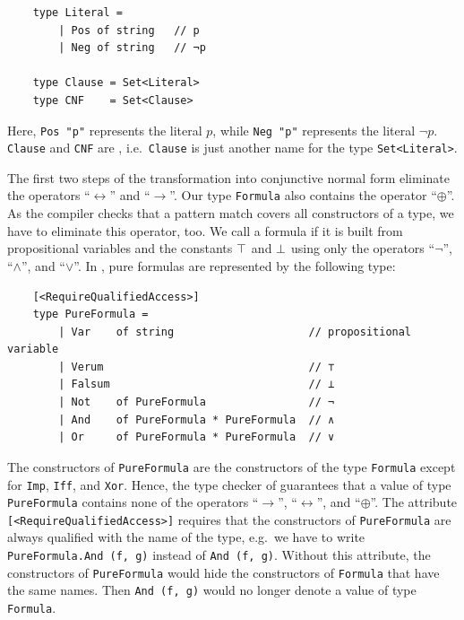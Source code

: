 \begin{verbatim}
    type Literal =
        | Pos of string   // p
        | Neg of string   // ¬p

    type Clause = Set<Literal>
    type CNF    = Set<Clause>
\end{verbatim}

\noindent
Here, \texttt{Pos "p"} represents the literal $p$, while \texttt{Neg "p"} represents the literal $\neg p$.
\texttt{Clause} and \texttt{CNF} are , i.e.~\texttt{Clause} is just another name for the
type \texttt{Set<Literal>}.

The first two steps of the transformation into conjunctive normal form eliminate the operators
``$\leftrightarrow$'' and ``$\rightarrow$''.  Our type \texttt{Formula} also contains the operator
``$\oplus$''.  As the \Fsharp{} compiler checks that a pattern match covers all constructors of a type, we
have to eliminate this operator, too.  We call a formula  if it is
built from propositional variables and the constants $\top$ and $\bot$ using only the operators
``$\neg$'', ``$\wedge$'', and ``$\vee$''.  In \Fsharp, pure formulas are represented by the following type:

\begin{verbatim}
    [<RequireQualifiedAccess>]
    type PureFormula =
        | Var    of string                     // propositional variable
        | Verum                                // ⊤
        | Falsum                               // ⊥
        | Not    of PureFormula                // ¬
        | And    of PureFormula * PureFormula  // ∧
        | Or     of PureFormula * PureFormula  // ∨
\end{verbatim}

\noindent
The constructors of \texttt{PureFormula} are the constructors of the type \texttt{Formula} except for
\texttt{Imp}, \texttt{Iff}, and \texttt{Xor}.  Hence, the type checker of \Fsharp{} guarantees that a value of
type \texttt{PureFormula} contains none of the operators ``$\rightarrow$'', ``$\leftrightarrow$'', and
``$\oplus$''.  The attribute \texttt{[<RequireQualifiedAccess>]} requires that the constructors of
\texttt{PureFormula} are always qualified with the name of the type, e.g.~we have to write
\texttt{PureFormula.And (f, g)} instead of \texttt{And (f, g)}.  Without this attribute, the constructors of
\texttt{PureFormula} would hide the constructors of \texttt{Formula} that have the same names.  Then
\texttt{And (f, g)} would no longer denote a value of type \texttt{Formula}.

